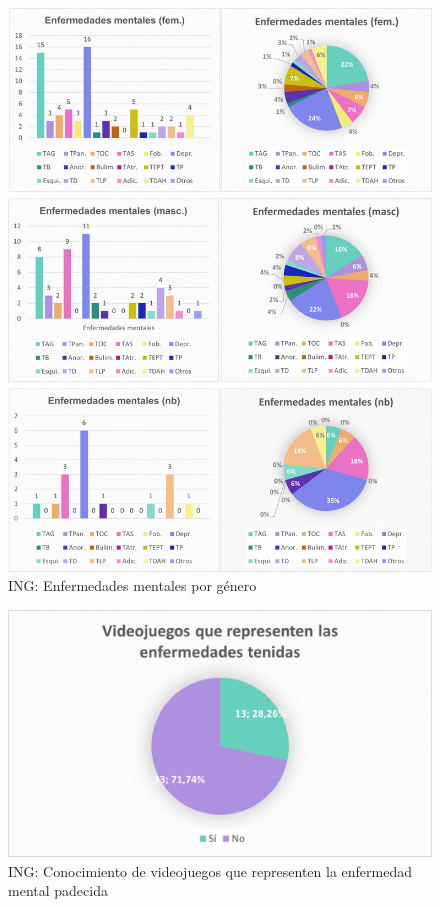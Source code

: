 \documentclass[12pt, a4paper,twoside,titlepage]{book}
\begin{document}
\begin{figure}
    \centering
    \includegraphics[width=1\linewidth]{ANEXO ING/25AnexINGEnfgene}
    \caption{ING: Enfermedades mentales por género}
\end{figure}

\begin{figure}
    \centering
    \includegraphics[width=.8\linewidth]{ANEXO ING/25AnexINGEnften}
    \caption{ING: Conocimiento de videojuegos que representen la enfermedad mental padecida}
    \label{fig:INGVidenf}
\end{figure}
\end{document}
